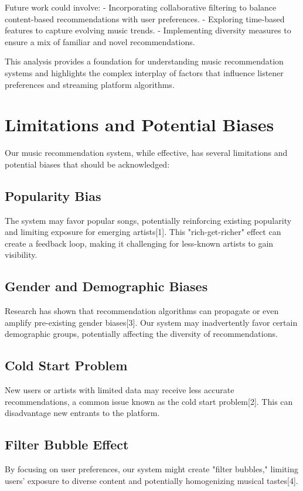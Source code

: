 \documentclass[runningheads]{llncs}
\begin{document}
Future work could involve:
- Incorporating collaborative filtering to balance content-based recommendations with user preferences.
- Exploring time-based features to capture evolving music trends.
- Implementing diversity measures to ensure a mix of familiar and novel recommendations.

This analysis provides a foundation for understanding music recommendation systems and highlights the complex interplay of factors that influence listener preferences and streaming platform algorithms.

\section{Limitations and Potential Biases}

Our music recommendation system, while effective, has several limitations and potential biases that should be acknowledged:

\subsection{Popularity Bias}
The system may favor popular songs, potentially reinforcing existing popularity and limiting exposure for emerging artists[1]. This "rich-get-richer" effect can create a feedback loop, making it challenging for less-known artists to gain visibility.

\subsection{Gender and Demographic Biases}
Research has shown that recommendation algorithms can propagate or even amplify pre-existing gender biases[3]. Our system may inadvertently favor certain demographic groups, potentially affecting the diversity of recommendations.

\subsection{Cold Start Problem}
New users or artists with limited data may receive less accurate recommendations, a common issue known as the cold start problem[2]. This can disadvantage new entrants to the platform.

\subsection{Filter Bubble Effect}
By focusing on user preferences, our system might create "filter bubbles," limiting users' exposure to diverse content and potentially homogenizing musical tastes[4].
\end{document}
